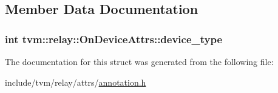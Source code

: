 \subsection{Member Data Documentation}
\subsubsection[{\texorpdfstring{device\+\_\+type}{device_type}}]{\setlength{\rightskip}{0pt plus 5cm}int tvm\+::relay\+::\+On\+Device\+Attrs\+::device\+\_\+type}\hypertarget{structtvm_1_1relay_1_1OnDeviceAttrs_a908c8763c9636c10c66a0ef1fea05da0}{}\label{structtvm_1_1relay_1_1OnDeviceAttrs_a908c8763c9636c10c66a0ef1fea05da0}


The documentation for this struct was generated from the following file\+:\begin{DoxyCompactItemize}
\item 
include/tvm/relay/attrs/\hyperlink{annotation_8h}{annotation.\+h}\end{DoxyCompactItemize}
